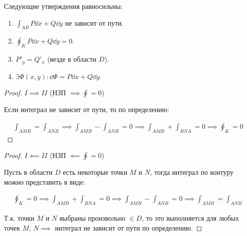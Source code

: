 \begin{theorem}\label{path-ind-cr}
  Следующие утверждения равносильны:
  \begin{enumerate}[label = \Roman*.]
    \item \(\int_{AB} P \dd x + Q \dd y\) не зависит от пути.
    \item \(\oint_{K} P \dd x + Q \dd y = 0\).
    \item \(P'_{y} = Q'_{x}\) (везде в области \(D\)).
    \item \(\exists \Phi(x, y) \colon \dd \Phi = P \dd x + Q \dd y\).
  \end{enumerate}
\end{theorem}
\begin{proof}
  \(I \implies II\) (НЗП \(\implies \oint = 0\))

  Если интеграл не зависит от пути, то по определению:

  \begin{align*}
    \int_{AMB} = \int_{ANB}
    \implies \int_{AMB} - \int_{ANB} = 0
    \implies \int_{AMB} + \int_{BNA} = 0
    \implies \oint_{K} = 0
  \end{align*}
\end{proof}
\begin{proof}
  \(I \impliedby II\) (НЗП \(\impliedby \oint = 0\))

  Пусть в области \(D\) есть некоторые точки \(M\) и \(N\), тогда интеграл по
  контуру можно представить в виде:

  \begin{align*}
    \oint_{K} = 0
    \implies \int_{AMB} + \int_{BNA} = 0
    \implies \int_{AMB} - \int_{ANB} = 0
    \implies \int_{AMB} = \int_{ANB}
  \end{align*}

  Т.к. точки \(M\) и \(N\) выбраны произвольно \(\in D\), то это выполняется для
  любых точек \(M\), \(N \implies\) интеграл не зависит от пути по определению.
\end{proof}
